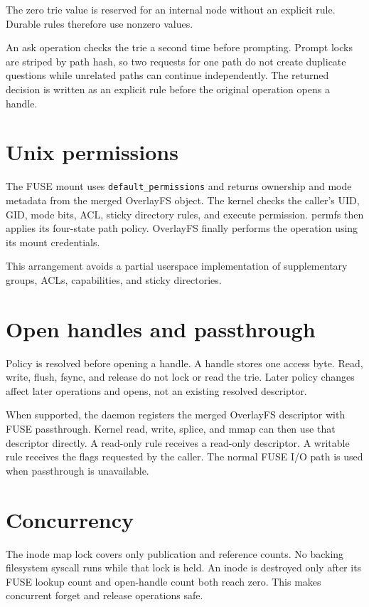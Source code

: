 \documentclass[11pt,a4paper]{article}
\begin{document}
The zero trie value is reserved for an internal node without an explicit
rule. Durable rules therefore use nonzero values.

An ask operation checks the trie a second time before prompting. Prompt locks
are striped by path hash, so two requests for one path do not create duplicate
questions while unrelated paths can continue independently. The returned
decision is written as an explicit rule before the original operation opens a
handle.

\section{Unix permissions}

The FUSE mount uses \texttt{default\_permissions} and returns ownership and
mode metadata from the merged OverlayFS object. The kernel checks the caller's
UID, GID, mode bits, ACL, sticky directory rules, and execute permission.
permfs then applies its four-state path policy. OverlayFS finally performs
the operation using its mount credentials.

This arrangement avoids a partial userspace implementation of supplementary
groups, ACLs, capabilities, and sticky directories.

\section{Open handles and passthrough}

Policy is resolved before opening a handle. A handle stores one access byte.
Read, write, flush, fsync, and release do not lock or read the trie. Later
policy changes affect later operations and opens, not an existing resolved
descriptor.

When supported, the daemon registers the merged OverlayFS descriptor with
FUSE passthrough. Kernel read, write, splice, and mmap can then use that
descriptor directly. A read-only rule receives a read-only descriptor. A
writable rule receives the flags requested by the caller. The normal FUSE I/O
path is used when passthrough is unavailable.

\section{Concurrency}

The inode map lock covers only publication and reference counts. No backing
filesystem syscall runs while that lock is held. An inode is destroyed only
after its FUSE lookup count and open-handle count both reach zero. This makes
concurrent forget and release operations safe.
\end{document}
